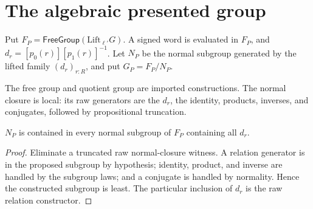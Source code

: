 \section{The algebraic presented group}

\begin{definition}
Put $F_P=\mathsf{FreeGroup}(\mathrm{Lift}_{\ell'}G)$. A signed word is evaluated in $F_P$, and $d_r=[p_0(r)][p_1(r)]^{-1}$. Let $N_P$ be the normal subgroup generated by the lifted family $(d_r)_{r:R}$, and put $G_P=F_P/N_P$.
\end{definition}

The free group and quotient group are imported constructions. The normal closure is local: its raw generators are the $d_r$, the identity, products, inverses, and conjugates, followed by propositional truncation.

\begin{lemma}
$N_P$ is contained in every normal subgroup of $F_P$ containing all $d_r$.
\end{lemma}
\begin{proof}
Eliminate a truncated raw normal-closure witness. A relation generator is in the proposed subgroup by hypothesis; identity, product, and inverse are handled by the subgroup laws; and a conjugate is handled by normality. Hence the constructed subgroup is least. The particular inclusion of $d_r$ is the raw relation constructor.
\end{proof}
